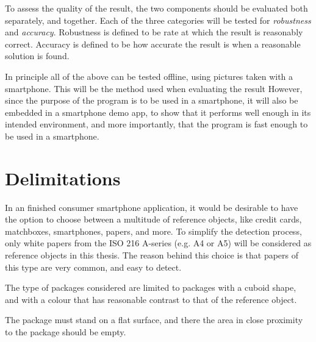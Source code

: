 To assess the quality of the result, the two components should be evaluated both separately, and together. 
Each of the three categories will be tested for \textit{robustness} and \textit{accuracy}.
Robustness is defined to be rate at which the result is reasonably correct.
Accuracy is defined to be how accurate the result is when a reasonable solution is found.

In principle all of the above can be tested offline, using pictures taken with a smartphone.
This will be the method used when evaluating the result
However, since the purpose of the program is to be used in a smartphone, it will also be embedded in a smartphone demo app, to show that it performs well enough in its intended environment, and more importantly, that the program is fast enough to be used in a smartphone.

\section{Delimitations} %
In an finished consumer smartphone application, it would be desirable to have the option to choose between a multitude of reference objects, like credit cards, matchboxes, smartphones, papers, and more. 
To simplify the detection process, only white papers from the ISO 216 A-series (e.g. A4 or A5) will be considered as reference objects in this thesis.
The reason behind this choice is that papers of this type are very common, and easy to detect.

The type of packages considered are limited to packages with a cuboid shape, and with a colour that has reasonable contrast to that of the reference object.

The package must stand on a flat surface, and there the area in close proximity to the package should be empty.


